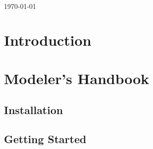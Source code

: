 \documentclass[a4paper, 12pt, titlepage, headsepline, listof = totoc, bibliography = totoc, numbers = noenddot]{scrbook} %
\begin{document}
\begin{titlepage}
{\large \today}\\[3cm] %


 

\vfill %

\end{titlepage}


\thispagestyle{empty}
\tableofcontents


\clearpage
\setcounter{page}{1}

\chapter{Introduction}


\chapter{Modeler's Handbook}
\label{cha:modelersHandbook}



\section{Installation}
\label{sec: Installation}


\section{Getting Started}
\label{sec: Getting Started}

\end{document}
